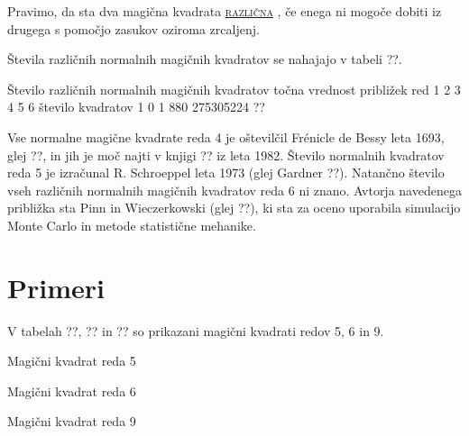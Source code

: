 \documentclass[a4paper,12pt]{article}
\theoremstyle{definition}
\theoremstyle{plain}
\newcommand{\pojem}[1]{
   \underline{\textsc{#1}}
}
\begin{document}
   Pravimo, da sta dva magična kvadrata \pojem{različna}, če enega ni mogoče dobiti
   iz drugega s pomočjo zasukov oziroma zrcaljenj.

Števila različnih normalnih magičnih kvadratov se nahajajo v tabeli ??.

   Število različnih normalnih magičnih kvadratov
      točna vrednost približek
      red 1 2 3 4 5 6
      število kvadratov 1 0 1 880 275305224 ??

Vse normalne magične kvadrate reda 4 je oštevilčil Frénicle de Bessy
leta 1693, glej ??, in jih je moč najti v knjigi ??
iz leta 1982. Število normalnih kvadratov reda 5 je izračunal
R. Schroeppel leta 1973 (glej Gardner ??).
Natančno število vseh različnih normalnih magičnih kvadratov reda 6 ni znano.
Avtorja navedenega približka sta Pinn in Wieczerkowski (glej ??), ki
sta za oceno uporabila simulacijo Monte Carlo in metode statistične mehanike.


\section{Primeri}

V tabelah ??, ?? in ?? so prikazani
magični kvadrati redov 5, 6 in 9.

Magični kvadrat reda 5

Magični kvadrat reda 6

Magični kvadrat reda 9


\end{document}
